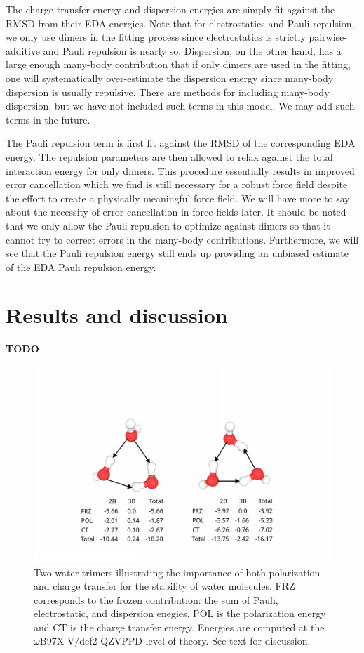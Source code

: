 \documentclass[journal=jacsat,manuscript=article]{achemso}
\begin{document}
The charge transfer energy and dispersion energies are simply fit against the RMSD
from their EDA energies. Note that for electrostatics and Pauli repulsion, we only use dimers in
the fitting process since electrostatics is strictly pairwise-additive and Pauli repulsion is nearly so.
Dispersion, on the other hand, has a large enough many-body contribution that if only dimers
are used in the fitting, one will systematically over-estimate the dispersion energy since
many-body dispersion is usually repulsive. There are methods for including many-body dispersion,
but we have not included such terms in this model.\cite{anatole2010two,van2018new}
We may add such terms in the future.

The Pauli repulsion term is first fit against the RMSD of the corresponding EDA energy.
The repulsion parameters are then allowed to relax against the total interaction energy
for only dimers. This procedure essentially results in improved error cancellation
which we find is still necessary for a robust force field despite the effort
to create a physically meaningful force field. We will have more to say about the necessity
of error cancellation in force fields later. It should be noted that we only allow
the Pauli repulsion to optimize against dimers so that it cannot try to correct errors
in the many-body contributions. Furthermore, we will see that the Pauli repulsion energy
still ends up providing an unbiased estimate of the EDA Pauli repulsion energy.

\section*{Results and discussion}

\textbf{TODO}



\begin{figure}
  \includegraphics*[width=\textwidth]{figures/trimer_mbe_example.png}
  \caption{Two water trimers illustrating the importance of both polarization
  and charge transfer for the stability of water molecules. FRZ corresponds to
  the frozen contribution: the sum of Pauli, electrostatic, and dispersion enegies. POL is the polarization
  energy and CT is the charge transfer energy. Energies are computed at the
  $\omega$B97X-V/def2-QZVPPD level of theory. See text for discussion.}
\end{figure}
\end{document}
